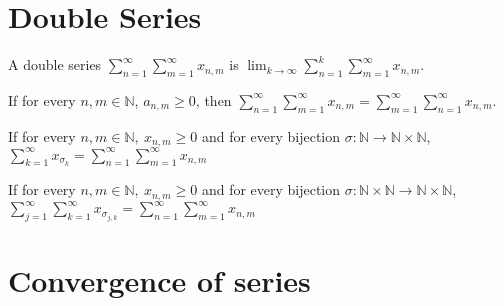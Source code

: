 \section{Double Series}
	\begin{definition}
		A double series $\sum_{n=1}^\infty \sum_{m=1}^\infty x_{n,m}$ is $\lim_{k \to \infty} \sum_{n=1}^k \sum_{m=1}^\infty x_{n,m}$.
	\end{definition}
	\begin{theorem}
		If for every $n,m \in \mathbb{N}$, $a_{n,m} \ge 0$, then $\sum_{n=1}^\infty \sum_{m=1}^\infty x_{n,m} = \sum_{m=1}^\infty \sum_{n=1}^\infty x_{n,m}$.
	\end{theorem}
	\begin{theorem}
		If for every $n,m \in \mathbb{N},\ x_{n,m} \ge 0$ and for every bijection $\sigma : \mathbb{N} \to \mathbb{N}\times\mathbb{N}$, $\sum_{k=1}^\infty x_{\sigma_k} = \sum_{n=1}^\infty \sum_{m=1}^\infty x_{n,m}$
	\end{theorem}
	\begin{corollary}
		If for every $n,m \in \mathbb{N},\ x_{n,m} \ge 0$ and for every bijection $\sigma : \mathbb{N}\times\mathbb{N} \to \mathbb{N}\times\mathbb{N}$, $\sum_{j=1}^\infty \sum_{k=1}^\infty x_{\sigma_{j,k}} = \sum_{n=1}^\infty \sum_{m=1}^\infty x_{n,m}$
	\end{corollary}

\section{Convergence of series}
